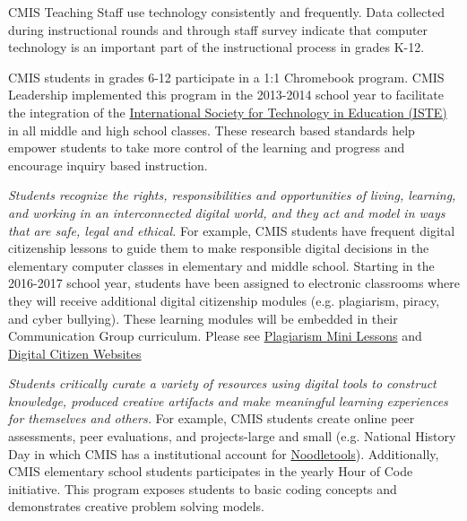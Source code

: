 \documentclass{report}
\begin{document}
\begin{findings}
CMIS Teaching Staff use technology consistently and frequently. Data collected during instructional rounds and through staff survey indicate that computer technology is an important part of the instructional process in grades K-12. 


CMIS students in grades 6-12 participate in a 1:1 Chromebook program. CMIS Leadership implemented this program in the 2013-2014 school year to facilitate the integration of the \href{https://drive.google.com/a/cmis.ac.th/file/d/0ByVFfrm0zfolakw5TUstQ1ZrVDFCRjR1d1JQSUpQbkZaVDBr/view?usp=sharing}{International Society for Technology in Education (ISTE)} in all middle and high school classes. These research based standards help empower students to take more control of the learning and progress and encourage inquiry based instruction. 

\textit{Students recognize the rights, responsibilities and opportunities of living, learning, and working in an interconnected digital world, and they act and model in ways that are safe, legal and ethical.} For example, CMIS students have frequent digital citizenship lessons to guide them to make responsible digital decisions in the elementary computer classes in elementary and middle school. Starting in the 2016-2017 school year, students have been assigned to electronic classrooms where they will receive additional digital citizenship modules (e.g. plagiarism, piracy, and cyber bullying). These learning modules will be embedded in their Communication Group curriculum. Please see \href{https://docs.google.com/a/cmis.ac.th/document/d/1TRVPFDs7fyAcRDXcuaha4E4jx53zryfG155vC8Sd-sk/edit?usp=sharing}{Plagiarism Mini Lessons} and \href{https://docs.google.com/a/cmis.ac.th/document/d/1xBZgw3vpW2UPOx_kEWC0oCk34H1OWDri1o4hcQS5VQc/edit?usp=sharing}{Digital Citizen Websites} 

\textit{Students critically curate a variety of resources using digital tools
to construct knowledge, produced creative artifacts and make
meaningful learning experiences for themselves and others.} For example, CMIS students create online peer assessments, peer evaluations, and projects-large and small (e.g. National History Day in which CMIS has a institutional account for \href{http://www.noodletools.com/}{Noodletools}). Additionally, CMIS elementary school students participates in the yearly Hour of Code initiative. This program exposes students to basic coding concepts and demonstrates creative problem solving models. 


\end{findings}
\end{document}
